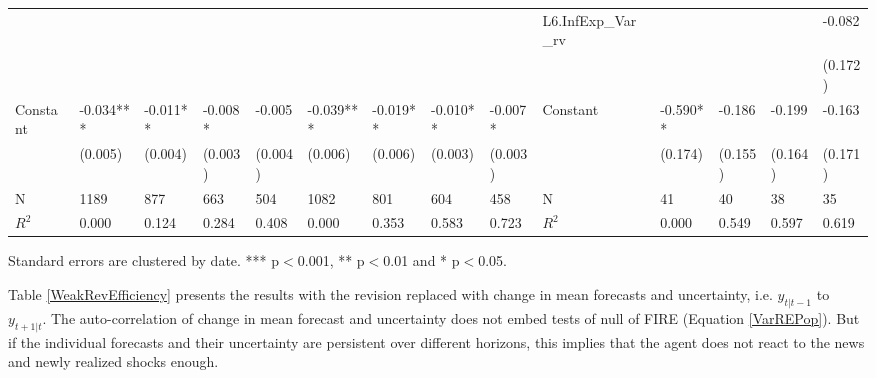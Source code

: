 \documentclass[12pt]{article}
\begin{document}
\begin{table}
\begin{adjustbox}{width={24cm},totalheight={14cm}}
\begin{threeparttable}
\begin{tabular}{llllllllllllll}
					&               &           &          &          &               &           &           &           & L6.InfExp\_Var\_rv  &               &          &          & -0.082   \\
					&               &           &          &          &               &           &           &           &                     &               &          &          & (0.172)  \\
					Constant               & -0.034***     & -0.011**  & -0.008*  & -0.005   & -0.039***     & -0.019**  & -0.010**  & -0.007*   & Constant               & -0.590**      & -0.186   & -0.199   & -0.163   \\
					& (0.005)       & (0.004)   & (0.003)  & (0.004)  & (0.006)       & (0.006)   & (0.003)   & (0.003)   &                     & (0.174)       & (0.155)  & (0.164)  & (0.171)  \\
					\hline 
					N                   & 1189          & 877       & 663      & 504      & 1082          & 801       & 604       & 458       & N                   & 41            & 40       & 38       & 35       \\
					$R^2$               & 0.000         & 0.124     & 0.284    & 0.408    & 0.000         & 0.353     & 0.583     & 0.723     & $R^2$               & 0.000         & 0.549    & 0.597    & 0.619 \\
					\hline    
				\end{tabular}
					\begin{tablenotes}
						\item Standard errors are clustered by date. *** p$<$0.001, ** p$<$0.01 and * p$<$0.05. 
					\end{tablenotes}
				\end{threeparttable}
				\end{adjustbox}
		\end{table}
	
	
	Table \ref{WeakRevEfficiency} presents the results with the revision replaced with change in mean forecasts and uncertainty, i.e. $y_{t|t-1}$ to $y_{t+1|t}$. The auto-correlation of change in mean forecast and uncertainty does not embed tests of null of FIRE (Equation \ref{VarREPop}). But if the individual forecasts and their uncertainty are persistent over different horizons, this implies that the agent does not react to the news and newly realized shocks enough. 
	
\end{document}
